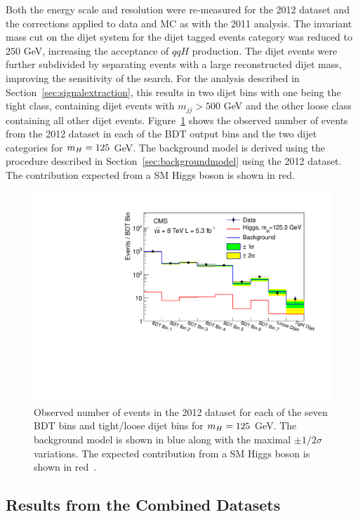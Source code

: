 Both the energy scale and resolution were re-measured for the 2012 dataset and the corrections
applied to data and MC as with the 2011 analysis. The invariant mass cut on the dijet system for 
the dijet tagged events category was reduced to $250$ GeV, increasing the acceptance of $qqH$ production.
The dijet events were further subdivided by separating events with a large reconstructed dijet mass,
improving the sensitivity of the search. For the analysis described in Section~\ref{sec:signalextraction}, 
this results in two dijet bins with one being the tight class, containing dijet events with $m_{jj}>500$ 
GeV and the other loose class containing all other dijet events.
Figure~\ref{fig:results8TeV} shows the observed number of events from the 2012 dataset in each 
of the BDT output bins and the two dijet categories for $m_{H}=125$ GeV. The background model is derived 
using the procedure described in Section~\ref{sec:backgroundmodel} using the 2012 dataset. 
The contribution expected from a SM Higgs boson is shown in red. 

\begin{figure}
\begin{center}
  \includegraphics[width=.8\textwidth]{hgg8TeV/hgg_MassWindow_model_m125_8TeV.pdf}
\end{center}
 \caption{Observed number of events in the 2012 dataset for each of the seven BDT bins and tight/loose dijet bins
 for $m_{H}=125$ GeV. The background model is shown in blue along with the maximal $\pm 1/2\sigma$ variations.
 The expected contribution from a SM Higgs boson is shown in red~\citep{HIG-12-036}.}
 \label{fig:results8TeV}
\end{figure}

\subsection{Results from the Combined Datasets}
\label{sec:resultscombined}

